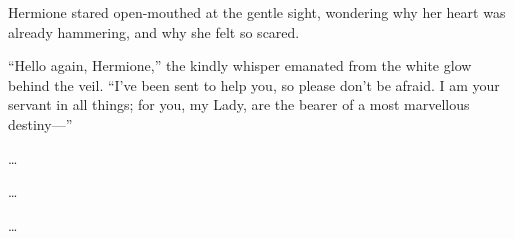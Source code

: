 Hermione stared open-mouthed at the gentle sight, wondering why her heart was already hammering, and why she felt so scared.

“Hello again, Hermione,” the kindly whisper emanated from the white glow behind the veil. “I’ve been sent to help you, so please don’t be afraid. I am your servant in all things; for you, my Lady, are the bearer of a most marvellous destiny—”

\begin{center}
…

…

…
\end{center}

